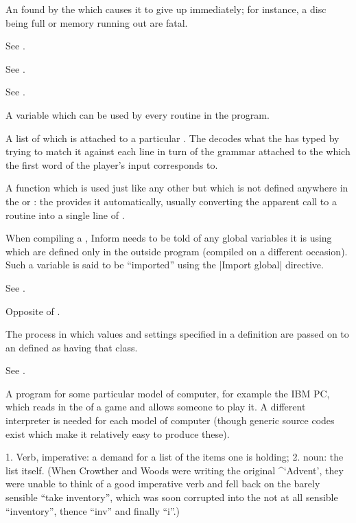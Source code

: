 %
An  found by the  which causes it to give up immediately;
for instance, a disc being full or memory running out are fatal.

%
See .

%
See .

%
See .

%
A variable which can be used by every routine in the program.

%
A list of  which is attached to a particular .  The 
decodes what the  has typed by trying to match it against each line
in turn of the grammar attached to the  which the first word of the
player's input corresponds to.

%
A function which is used just like any other  but which is
not defined anywhere in the  or : the 
provides it automatically, usually converting the apparent call to a
routine into a single line of .

%
When compiling a , Inform needs to be told of any global
variables it is using which are defined only in the outside program
(compiled on a different occasion).  Such a variable is said to be
``imported'' using the |Import global| directive.

%
See .

%
Opposite of .

%
The process in which  values and  settings specified
in a  definition are passed on to an  defined as having
that class.

%
See .

%
A program for some particular model of computer, for example the IBM PC, which
reads in the  of a game and allows someone to play it.  A
different interpreter is needed for each model of computer (though generic
source codes exist which make it relatively easy to produce these).

%
1. Verb, imperative: a demand for a list of the items one is holding; 2.
noun: the list itself.  (When Crowther and Woods were writing the original
^{`Advent'}, they were unable to think of a good imperative verb and fell
back on the barely sensible ``take inventory'', which was soon corrupted
into the not at all sensible ``inventory'', thence ``inv'' and finally
``i''.)

